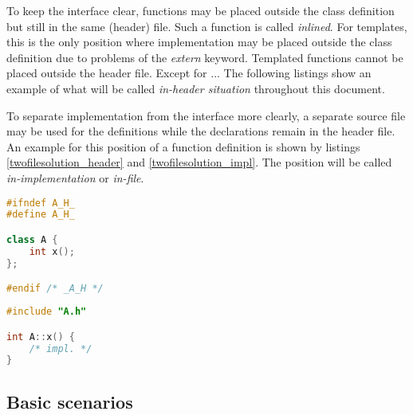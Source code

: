 

To keep the interface clear,  functions may be 
placed outside the class definition but still in the same (header) file. Such a 
function is called \textit{inlined}. For templates, this is the only position 
where implementation may be placed outside the class definition due to problems 
of the \textit{extern} keyword. Templated functions cannot be placed outside the 
header file. Except for ... %
The following listings show an example of what will be called 
\textit{in-header situation} throughout this document.



To  separate implementation from the interface more 
clearly, a separate source file may be used for the definitions while the 
declarations remain in the header file. An example for this position of a 
function definition is shown by listings \ref{twofilesolution_header} and
\ref{twofilesolution_impl}. The position will be called 
\textit{in-implementation} or \textit{in-file}.

\vspace{0.5cm}
\begin{minipage}{.48\textwidth}
\lstset{xrightmargin=0.5cm}
\begin{lstlisting}[caption={A.h},label={twofilesolution_header},language=C++]
#ifndef A_H_
#define A_H_

class A {
	int x();
};

#endif /* _A_H */
\end{lstlisting}
\end{minipage}%
\begin{minipage}{.48\textwidth}
\lstset{xleftmargin=0.5cm}
\begin{lstlisting}[caption={A.cpp},label={twofilesolution_impl},language=C++]
#include "A.h"

int A::x() { 
    /* impl. */ 
}
\end{lstlisting}
\end{minipage}

\subsection{Basic scenarios}

